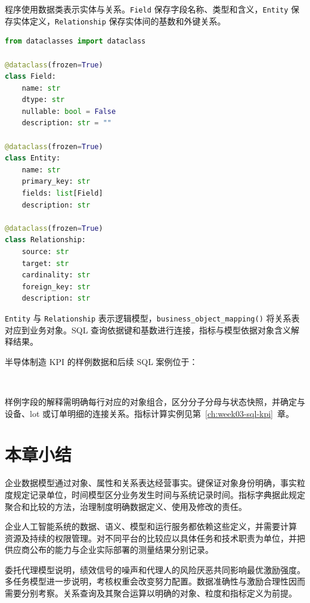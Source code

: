 程序使用数据类表示实体与关系。\texttt{Field} 保存字段名称、类型和含义，\texttt{Entity} 保存实体定义，\texttt{Relationship} 保存实体间的基数和外键关系。
\begin{lstlisting}[language=Python,caption={实体、字段和关系}]
from dataclasses import dataclass

@dataclass(frozen=True)
class Field:
    name: str
    dtype: str
    nullable: bool = False
    description: str = ""

@dataclass(frozen=True)
class Entity:
    name: str
    primary_key: str
    fields: list[Field]
    description: str

@dataclass(frozen=True)
class Relationship:
    source: str
    target: str
    cardinality: str
    foreign_key: str
    description: str
\end{lstlisting}

\texttt{Entity} 与 \texttt{Relationship} 表示逻辑模型，\texttt{business\_object\_mapping()} 将关系表对应到业务对象。SQL 查询依据键和基数进行连接，指标与模型依据对象含义解释结果。

半导体制造 KPI 的样例数据和后续 SQL 案例位于：
\begin{center}
\\
\end{center}

样例字段的解释需明确每行对应的对象组合，区分分子分母与状态快照，并确定与设备、lot 或订单明细的连接关系。指标计算实例见第~\ref{ch:week03-sql-kpi}~章。

\section*{本章小结}

企业数据模型通过对象、属性和关系表达经营事实。键保证对象身份明确，事实粒度规定记录单位，时间模型区分业务发生时间与系统记录时间。指标字典据此规定聚合和比较的方法，治理制度明确数据定义、使用及修改的责任。

企业人工智能系统的数据、语义、模型和运行服务都依赖这些定义，并需要计算
资源及持续的权限管理。对不同平台的比较应以具体任务和技术职责为单位，并把
供应商公布的能力与企业实际部署的测量结果分别记录。

委托代理模型说明，绩效信号的噪声和代理人的风险厌恶共同影响最优激励强度。多任务模型进一步说明，考核权重会改变努力配置。数据准确性与激励合理性因而需要分别考察。关系查询及其聚合运算以明确的对象、粒度和指标定义为前提。

